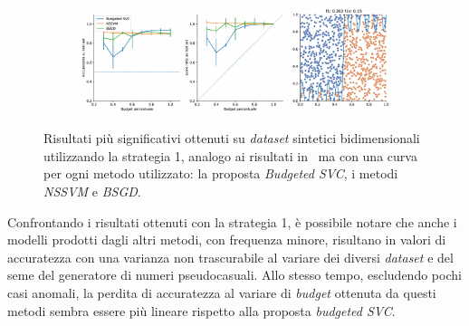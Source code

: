 \begin{figure}[ht]
    \hfill
    \begin{subfigure}{.9\textwidth}
        \centering
        \includegraphics[width=\textwidth]{img/comp_old/15.pdf}
    \end{subfigure}
\caption[]{Risultati più significativi ottenuti su \emph{dataset} sintetici bidimensionali utilizzando la strategia 1, analogo ai risultati in~ ma con una curva per ogni metodo utilizzato: la proposta \emph{Budgeted SVC}, i metodi \emph{NSSVM} e \emph{BSGD}.}
\label{fig:comp_old}
\end{figure}
Confrontando i risultati ottenuti con la strategia 1, è possibile notare che anche i modelli prodotti dagli altri metodi, con frequenza minore, risultano in valori di accuratezza con una varianza non trascurabile al variare dei diversi \emph{dataset} e del seme del generatore di numeri pseudocasuali.
Allo stesso tempo, escludendo pochi casi anomali, la perdita di accuratezza al variare di \emph{budget} ottenuta da questi metodi sembra essere più lineare rispetto alla proposta \emph{budgeted SVC}.
